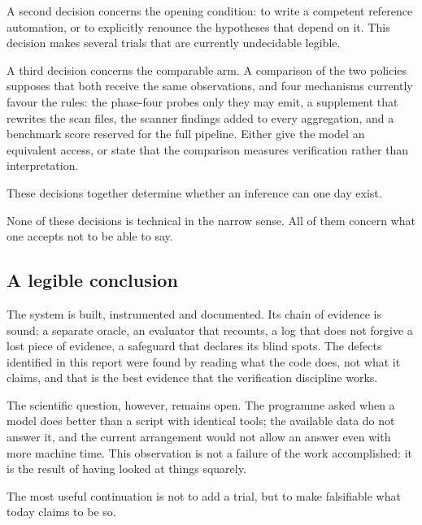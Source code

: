 A second decision concerns the opening condition: to write a competent reference automation, or to explicitly renounce the hypotheses that depend on it. This decision makes several trials that are currently undecidable legible.

A third decision concerns the comparable arm. A comparison of the two policies supposes that both receive the same observations, and four mechanisms currently favour the rules: the phase-four probes only they may emit, a supplement that rewrites the scan files, the scanner findings added to every aggregation, and a benchmark score reserved for the full pipeline. Either give the model an equivalent access, or state that the comparison measures verification rather than interpretation.

These decisions together determine whether an inference can one day exist.

None of these decisions is technical in the narrow sense. All of them concern what one accepts not to be able to say.

\subsection{A legible conclusion}

The system is built, instrumented and documented. Its chain of evidence is sound: a separate oracle, an evaluator that recounts, a log that does not forgive a lost piece of evidence, a safeguard that declares its blind spots. The defects identified in this report were found by reading what the code does, not what it claims, and that is the best evidence that the verification discipline works.

The scientific question, however, remains open. The programme asked when a model does better than a script with identical tools; the available data do not answer it, and the current arrangement would not allow an answer even with more machine time. This observation is not a failure of the work accomplished: it is the result of having looked at things squarely.

The most useful continuation is not to add a trial, but to make falsifiable what today claims to be so.
